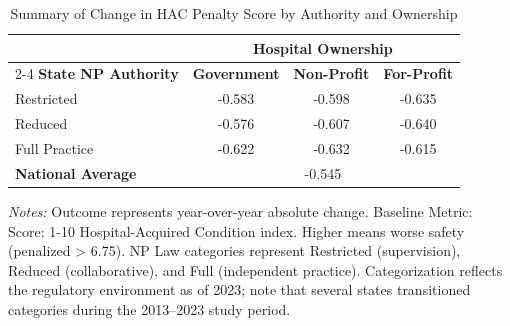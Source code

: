 \begin{table}[htbp]
    \centering
    \caption{Summary of Change in HAC Penalty Score by Authority and Ownership}
    \label{tab:d_hac_total_score}
    \vspace{0.2cm}
    \begin{tabular}{lccc}
        \toprule
        & \multicolumn{3}{c}{\textbf{Hospital Ownership}} \\
        \cmidrule(lr){2-4}
        \textbf{State NP Authority} & \textbf{Government} & \textbf{Non-Profit} & \textbf{For-Profit} \\
        \midrule
        Restricted & -0.583 & -0.598 & -0.635 \\
        Reduced & -0.576 & -0.607 & -0.640 \\
        Full Practice & -0.622 & -0.632 & -0.615 \\
        \midrule
        \textbf{National Average} & \multicolumn{3}{c}{-0.545} \\
        \bottomrule
    \end{tabular}
    \vspace{0.1cm}
    \begin{minipage}{0.85\textwidth}
        \footnotesize \textit{Notes:} Outcome represents year-over-year absolute change. Baseline Metric: Score: 1-10 Hospital-Acquired Condition index. Higher means worse safety (penalized > 6.75). NP Law categories represent Restricted (supervision), Reduced (collaborative), and Full (independent practice). Categorization reflects the regulatory environment as of 2023; note that several states transitioned categories during the 2013--2023 study period.
    \end{minipage}
\end{table}